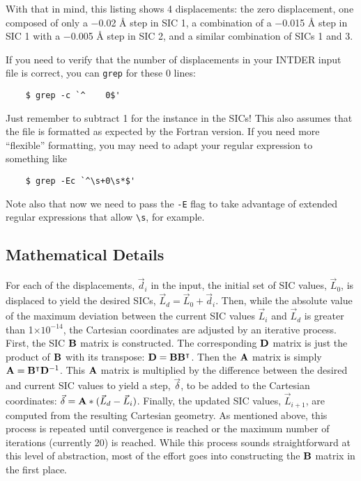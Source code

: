 \documentclass{article}
\newcommand\e[1]{$\times 10^{#1}$}
\begin{document}
With that in mind, this listing shows 4 displacements: the zero displacement,
one composed of only a $-$0.02 \AA{} step in SIC 1, a combination of a $-$0.015
\AA{} step in SIC 1 with a $-$0.005 \AA{} step in SIC 2, and a similar
combination of SICs 1 and 3.

\begin{tcolorbox}[title=Tip]
  If you need to verify that the number of displacements in your INTDER input
  file is correct, you can \verb|grep| for these 0 lines:

  \begin{lstlisting}
    $ grep -c `^    0$'
  \end{lstlisting}

  Just remember to subtract 1 for the instance in the SICs! This also assumes
  that the file is formatted as expected by the Fortran version. If you need
  more ``flexible'' formatting, you may need to adapt your regular expression to
  something like

  \begin{lstlisting}
    $ grep -Ec `^\s+0\s*$'
  \end{lstlisting}

  Note also that now we need to pass the \verb|-E| flag to take advantage of
  extended regular expressions that allow \verb|\s|, for example.
\end{tcolorbox}

\subsection{Mathematical Details}
\label{sec:disp-math}

For each of the displacements, $\vec{d}_i$ in the input, the initial set of SIC
values, $\vec{L}_0$, is displaced to yield the desired SICs,
$\vec{L}_d = \vec{L}_0 + \vec{d}_i$. Then, while the absolute value of the
maximum deviation between the current SIC values $\vec{L}_i$ and $\vec{L}_d$ is
greater than 1\e{-14}, the Cartesian coordinates are adjusted by an iterative
process. First, the SIC $\vb B$ matrix is constructed. The corresponding $\vb D$
matrix is just the product of $\vb B$ with its transpose:
$\vb D = \vb B \vb B^\intercal$. Then the $\vb A$ matrix is simply
$\vb A = \vb B^\intercal \vb D^{-1}$. This $\vb A$ matrix is multiplied by the
difference between the desired and current SIC values to yield a step,
$\vec{\delta}$, to be added to the Cartesian coordinates:
$\vec{\delta} = \vb A * (\vec{L}_d - \vec{L}_i)$. Finally, the updated SIC
values, $\vec{L}_{i+1}$, are computed from the resulting Cartesian geometry. As
mentioned above, this process is repeated until convergence is reached or the
maximum number of iterations (currently 20) is reached. While this process
sounds straightforward at this level of abstraction, most of the effort goes
into constructing the $\vb B$ matrix in the first place.
\end{document}

